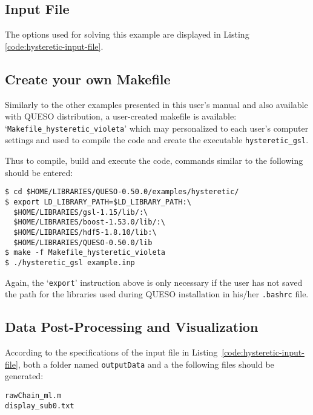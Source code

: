 \subsection{Input File}\label{sec:hysteretic-input-file}


The options used for solving this example are displayed in Listing \ref{code:hysteretic-input-file}. 



\subsection{Create your own Makefile}\label{sec:hysteretic-makefile}

Similarly to the other examples presented in this user's manual and also available with QUESO distribution, a user-created makefile is available: `\texttt{Makefile\_hysteretic\_violeta}' which may personalized to each user's computer settings and used to compile the code and create the executable \verb+hysteretic_gsl+. 

Thus to compile, build and execute the code,  commands similar to the following should be entered:
\begin{lstlisting}
$ cd $HOME/LIBRARIES/QUESO-0.50.0/examples/hysteretic/
$ export LD_LIBRARY_PATH=$LD_LIBRARY_PATH:\
  $HOME/LIBRARIES/gsl-1.15/lib/:\
  $HOME/LIBRARIES/boost-1.53.0/lib/:\
  $HOME/LIBRARIES/hdf5-1.8.10/lib:\
  $HOME/LIBRARIES/QUESO-0.50.0/lib 
$ make -f Makefile_hysteretic_violeta 
$ ./hysteretic_gsl example.inp
\end{lstlisting}

Again, the `\verb+export+' instruction above is only necessary if the user has not saved the path for the libraries used during QUESO installation in his/her \verb+.bashrc+ file. 



\subsection{Data Post-Processing and Visualization}\label{sec:hysteretic-results}



According to the specifications of the input file in Listing~\ref{code:hysteretic-input-file}, both a folder named \verb+outputData+ and a the following files should be generated:
\begin{verbatim}
rawChain_ml.m 
display_sub0.txt    
\end{verbatim}

